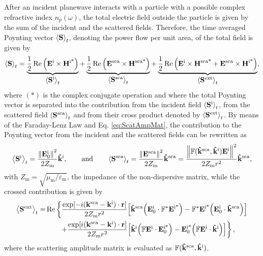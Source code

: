 After an incident planewave interacts with a particle with a possible complex refractive index $n_p(\omega)$, the total electric field outside the particle is given by the sum of the incident and the scattered fields. Therefore, the time averaged Poynting vector $\ev{\vb{S}}_t$, denoting the power flow per unit area, of the total field is given by
%
 \begin{align}
	\ev{\vb{S}}_t
		= \underbrace{\frac12 \Re \qty(\vb{E}^\text{i}\times\vb{H}^\text{i*})}_{\text{\normalsize $\ev{\vb{S}^\text{i}}_t $}} +
		\underbrace{\frac12 \Re \qty(\vb{E}^\text{sca}\times\vb{H}^\text{sca*})}_{\text{\normalsize $\ev{\vb{S}^\text{sca}}_t $}}+
		\underbrace{	\frac12 \Re\qty(\vb{E}^\text{i}\times\vb{H}^\text{sca*} + \vb{E}^\text{sca}\times\vb{H}^\text{i*})}_{\text{\normalsize$\ev{\vb{S}^\text{ext}}_t$}},
 \label{eq:Stot}
 \end{align}
%
where $(*)$ is the complex conjugate operation and where the total Poynting vector is separated into the contribution from the incident field $\ev{\vb{S}^\text{i}}_t$, from the scattered field $\ev{\vb{S}^\text{sca}}_t$ and from their cross product denoted by $\ev{\vb{S}^\text{ext}}_t$. By means of the Faraday-Lenz Law and Eq. \eqref{eq:ScatAmpMat}, the  contribution to the Poynting vector from the incident and the scattered fields can be rewritten as
%
 \begin{equation}
	\ev{\vb{S}^\text{i}}_t = \frac{\norm{\vb{E}_0^\text{i}}^2}{2 Z_\text{m}}\vu{k}^\text{i},
		\qquad\text{and}\qquad
	\ev{\vb{S}^\text{sca}}_t = \frac{\norm{\vb{E}^\text{sca}}^2}{2 Z_\text{m}}\vu{k}^\text{sca}
						=  \frac{\norm{\mathbb{F}(\vu{k}^\text{sca},\vu{k}^\text{i})\vb{E}^\text{i}}^2}{2 Z_\text{m}r^2}\vu{k}^\text{sca},
 \label{eq:AvePoyntingISca}
 \end{equation}
%
with $Z_\text{m} = \sqrt{\mu_\text{m}/\varepsilon_\text{m}}$, the impedance of the non-dispersive matrix, while the crossed contribution is given by
%
 \begin{align}
 \ev{\vb{S}^\text{ext}}_t = &\Re\left\{
								\frac{\exp[-i(\vb{k}^\text{sca}-\vb{k}^\text{i})\cdot\vb{r}]}{2 Z_\text{m}r^2}
								\qty[\vu{k}^\text{sca}\qty(\vb{E}_0^\text{i}\cdot \mathbb{F}^*\vb{E}^\text{i*})
									-\mathbb{F}^*\vb{E}^\text{i*}	\qty(\vb{E}^\text{i}_0\cdot\vu{k}^\text{sca})]
							 \right.\notag	\\
							&\hspace{2em}\left.
								+\frac{\exp[i(\vb{k}^\text{sca}-\vb{k}^\text{i})\cdot\vb{r}]}{2 Z_\text{m}r^2}
								\qty[\vu{k}^\text{i}\qty(\mathbb{F}\vb{E}^\text{i}\cdot\vb{E}^\text{i*}_0)
									-\vb{E}^\text{i*}_0 \qty(\mathbb{F}\vb{E}^\text{i}\cdot\vu{k}^\text{i})]	\right\},
 \label{eq:AvePoyntingExt}
 \end{align}
%
where the scattering amplitude matrix is evaluated as $\mathbb{F}(\vu{k}^\text{sca},\vu{k}^\text{i})$.

